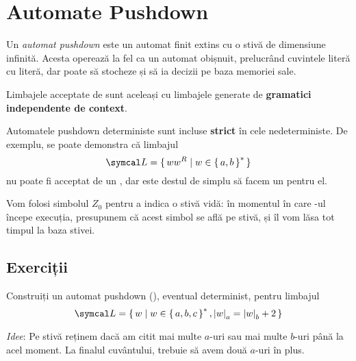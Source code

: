 \section*{Automate Pushdown}

Un \emph{automat pushdown} este un automat finit extins cu o stivă de dimensiune infinită. Acesta operează la fel ca un automat obișnuit, prelucrând cuvintele literă cu literă, dar poate să stocheze și să ia decizii pe baza memoriei sale.

Limbajele acceptate de \pda{} sunt aceleași cu limbajele generate de \textbf{gramatici independente de context}.

Automatele pushdown deterministe sunt incluse \textbf{strict} în cele nedeterministe.
De exemplu, se poate demonstra că limbajul
\[\limbaj = \set{ w w^R | w \in \set{a, b}^* }\]
nu poate fi acceptat de un \dpda{}, dar este destul de simplu să facem un \npda{} pentru el.

Vom folosi simbolul \(Z_0\) pentru a indica o stivă vidă: în momentul în care \pda{}-ul începe execuția, presupunem că acest simbol se află pe stivă, și îl vom lăsa tot timpul la baza stivei.

\subsection*{Exerciții}

\begin{exercise}
    Construiți un automat pushdown (\pda{}), eventual determinist, pentru limbajul
    \[
        \limbaj = \set{ w | w \in \set{a, b, c}^*, \abs{w}_a = \abs{w}_b + 2 }
    \]
\end{exercise}

\textit{Idee}: Pe stivă reținem dacă am citit mai multe \(a\)-uri sau mai multe \(b\)-uri până la acel moment. La finalul cuvântului, trebuie să avem două \(a\)-uri în plus.


